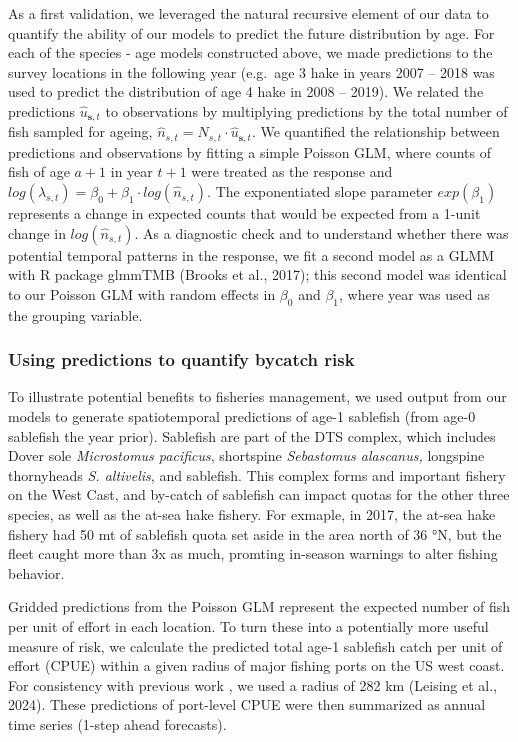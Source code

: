 \documentclass[
]{article}
\begin{document}
As a first validation, we leveraged the natural recursive element of our
data to quantify the ability of our models to predict the future
distribution by age. For each of the species - age models constructed
above, we made predictions to the survey locations in the following year
(e.g.~age 3 hake in years 2007 -- 2018 was used to predict the
distribution of age 4 hake in 2008 -- 2019). We related the predictions
\(\hat{u}_{\boldsymbol{s},t}\) to observations by multiplying
predictions by the total number of fish sampled for ageing,
\(\hat{n}_{s,t} = N_{s,t} \cdot \hat{u}_{\boldsymbol{s},t}\). We
quantified the relationship between predictions and observations by
fitting a simple Poisson GLM, where counts of fish of age \(a+1\) in
year \(t+1\) were treated as the response and
\(log(\lambda_{s,t}) = \beta_{0} + \beta_{1} \cdot log \left( \hat{n}_{s,t} \right)\).
The exponentiated slope parameter \(exp(\beta_{1})\) represents a change
in expected counts that would be expected from a 1-unit change in
\(log(\hat{n}_{s,t})\). As a diagnostic check and to understand whether
there was potential temporal patterns in the response, we fit a second
model as a GLMM with R package glmmTMB (Brooks et al., 2017); this
second model was identical to our Poisson GLM with random effects in
\(\beta_{0}\) and \(\beta_{1}\), where year was used as the grouping
variable.

\hypertarget{using-predictions-to-quantify-bycatch-risk}{%
\subsubsection{Using predictions to quantify bycatch
risk}\label{using-predictions-to-quantify-bycatch-risk}}

To illustrate potential benefits to fisheries management, we used output
from our models to generate spatiotemporal predictions of age-1
sablefish (from age-0 sablefish the year prior). Sablefish are part of
the DTS complex, which includes Dover sole \emph{Microstomus pacificus},
shortspine \emph{Sebastomus alascanus,} longspine thornyheads \emph{S.
altivelis}, and sablefish. This complex forms and important fishery on
the West Cast, and by-catch of sablefish can impact quotas for the other
three species, as well as the at-sea hake fishery. For exmaple, in 2017,
the at-sea hake fishery had 50 mt of sablefish quota set aside in the
area north of 36 °N, but the fleet caught more than 3x as much, promting
in-season warnings to alter fishing behavior.

Gridded predictions from the Poisson GLM represent the expected number
of fish per unit of effort in each location. To turn these into a
potentially more useful measure of risk, we calculate the predicted
total age-1 sablefish catch per unit of effort (CPUE) within a given
radius of major fishing ports on the US west coast. For consistency with
previous work , we used a radius of 282 km (Leising et al., 2024). These
predictions of port-level CPUE were then summarized as annual time
series (1-step ahead forecasts).
\end{document}
